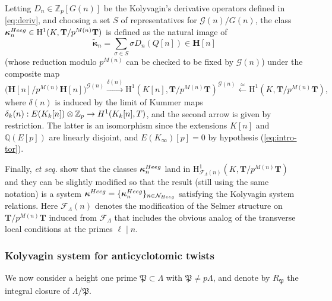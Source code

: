 \documentclass[10pt,reqno]{amsart}
\numberwithin{equation}{section}
\theoremstyle{plain}
\theoremstyle{definition}
\theoremstyle{definition}
\theoremstyle{plain}
\theoremstyle{plain}
\theoremstyle{plain}
\theoremstyle{plain}
\theoremstyle{plain}
\theoremstyle{plain}
\newcommand{\Z}{\mathbb{Z}}
\newcommand{\Q}{\mathbb{Q}}
\newcommand{\p}{\mathfrak{P}}
\newcommand{\bkappa}{\boldsymbol{\kappa}}
\newcommand{\Fcal}{\mathcal{F}}
\newcommand{\cN}{\mathcal{N}}
\newcommand{\rH}{\mathrm{H}}
\begin{document}
Letting $D_n\in\Z_p[G(n)]$ be the Kolyvagin's derivative operators defined in \eqref{eq:deriv}, and choosing a set $S$ %
of representatives for $\mathcal{G}(n)/G(n)$, the class $\bkappa_{n}^{\rm Heeg}\in \rH^1(K,\mathbf{T}/p^{M(n)}\mathbf{T})$ is %
defined as the natural image of 
\[
\tilde{\bkappa}_{n}=\sum_{\sigma\in S}\sigma D_n(Q[n])\in\mathbf{H}[n]
\]
(whose reduction modulo $p^{M(n)}$ can be checked to be fixed by $\mathcal{G}(n)$) under the composite map
\[
\bigl(\mathbf{H}[n]/p^{M(n)}\mathbf{H}[n]\bigr)^{\mathcal{G}(n)}\xrightarrow{\delta(n)}\rH^1(K[n],\mathbf{T}/p^{M(n)}\mathbf{T})^{\mathcal{G}(n)}\overset{\simeq}\longleftarrow\rH^1(K,\mathbf{T}/p^{M(n)}\mathbf{T}),
\]
where $\delta(n)$ is induced by the limit of Kummer maps $\delta_k(n):E(K_k[n])\otimes\Z_p\rightarrow{\rm H}^1(K_k[n],T)$, and the second arrow is given by restriction. The latter is an isomorphism since the extensions $K[n]$ and $\Q(E[p])$ are linearly disjoint, and $E(K_\infty)[p]=0$ by hypothesis (\ref{eq:intro-tor}).

Finally, \cite[Lem.~2.3.4]{howard} \emph{et seq.} show that the classes  $\bkappa_{n}^{\rm Heeg}$ land in $\rH^1_{\Fcal_\Lambda(n)}(K,\mathbf{T}/p^{M(n)}\mathbf{T})$ and they can be slightly modified so that the result (still using the same notation) is a system $\bkappa^{\rm Heeg}=\{\bkappa_{n}^{\rm Heeg}\}_{n\in\cN_{\rm Heeg}}$ satisfying the Kolyvagin system relations.  Here $\Fcal_\Lambda(n)$ denotes the modification of the Selmer structure on $\mathbf{T}/p^{M(n)}\mathbf{T}$ induced from
$\Fcal_\Lambda$ that includes the obvious analog of the transverse local conditions at the primes $\ell\mid n$. 

\subsubsection{Kolyvagin system for anticyclotomic twists}\label{subsec:tw}

We now consider a height one prime $\mathfrak{P}\subset\Lambda$ with $\mathfrak{P}\neq p\Lambda$, and denote by $R_\p$ the integral closure of $\Lambda/\p$. 
\end{document}
